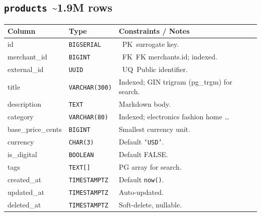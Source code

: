 \documentclass[8pt,a4paper]{extarticle}
\newcommand{\pkbadge}{\textcolor{primary}{\faKey}~PK}
\newcommand{\fkbadge}{\textcolor{secondary}{\faKey}~FK}
\newcommand{\uqbadge}{\textcolor{accent}{\faPen}~UQ}
\newcommand{\tttype}[1]{\texttt{#1}}
\newcommand{\tableheader}[2]{\subsection{\texttt{#1} \textcolor{accent}{\textbar{} #2}}}
\begin{document}
\tableheader{products}{\textasciitilde{}1.9M rows}
\begin{tcolorbox}[schemaframe]
  \renewcommand{\arraystretch}{1.05}
  \begin{tabularx}{\linewidth}{p{2cm} p{1.6cm} X p{2cm}}
    \toprule
    \rowcolor{primary!10}\textbf{Column} & \textbf{Type} & \textbf{Constraints / Notes} \\
    \midrule
    id               & \tttype{BIGSERIAL}   & \pkbadge\ surrogate key. \\
    merchant\_id     & \tttype{BIGINT}      & \fkbadge\ FK \textrightarrow{} merchants.id; indexed. \\
    external\_id     & \tttype{UUID}        & \uqbadge\ Public identifier. \\
    title            & \tttype{VARCHAR(300)}& Indexed; GIN trigram (pg\_trgm) for search. \\
    description      & \tttype{TEXT}        & Markdown body. \\
    category         & \tttype{VARCHAR(80)} & Indexed; electronics \textbar{} fashion \textbar{} home \textbar{} … \\
    base\_price\_cents& \tttype{BIGINT}     & Smallest currency unit. \\
    currency         & \tttype{CHAR(3)}     & Default \texttt{`USD'}. \\
    is\_digital      & \tttype{BOOLEAN}     & Default FALSE. \\
    tags             & \tttype{TEXT[]}      & PG array for search. \\
    created\_at      & \tttype{TIMESTAMPTZ} & Default \texttt{now()}. \\
    updated\_at      & \tttype{TIMESTAMPTZ} & Auto-updated. \\
    deleted\_at      & \tttype{TIMESTAMPTZ} & Soft-delete, nullable. \\
    \bottomrule
  \end{tabularx}
\end{tcolorbox}
\end{document}
